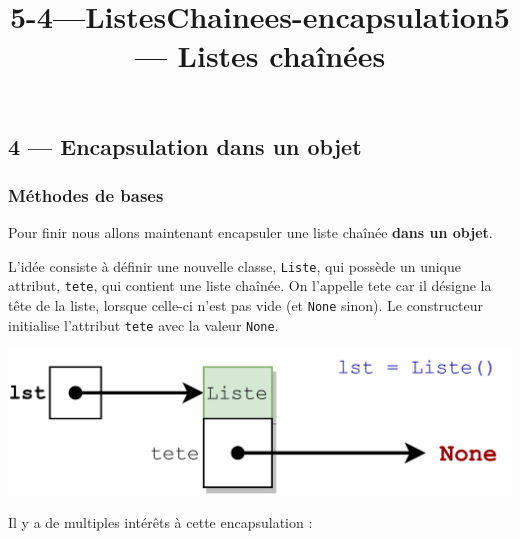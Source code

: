 \documentclass[a4paper,17pt]{extarticle}
\title{5-4---ListesChainees-encapsulation}
\let\origfigure\figure
\let\endorigfigure\endfigure
\renewenvironment{figure}[1][2] {
    \expandafter\origfigure\expandafter[H]
} {
    \endorigfigure
}
\begin{document}
    
    \title{5 --- Listes chaînées}

    
    

    
    \hypertarget{encapsulation-dans-un-objet}{%
\subsection{4 --- Encapsulation dans un
objet}\label{encapsulation-dans-un-objet}}

    \hypertarget{muxe9thodes-de-bases}{%
\subsubsection{Méthodes de bases}\label{muxe9thodes-de-bases}}
\begin{retenir}
    Pour finir nous allons maintenant encapsuler une liste chaînée
\textbf{dans un objet}.

L'idée consiste à définir une nouvelle classe, \texttt{Liste}, qui
possède un unique attribut, \texttt{tete}, qui contient une liste
chaînée. On l'appelle tete car il désigne la tête de la liste, lorsque
celle-ci n'est pas vide (et \texttt{None} sinon). Le constructeur
initialise l'attribut \texttt{tete} avec la valeur \texttt{None}.

        \end{retenir}
    \begin{figure}
\centering
\includegraphics{maillon6.png}
\caption{constructeur de Liste()}
\end{figure}

    Il y a de multiples intérêts à cette encapsulation :
\end{document}
